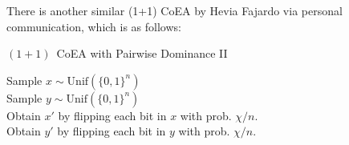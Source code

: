 \documentclass[a4paper,11pt]{report}
\theoremstyle{plain} %
\theoremstyle{definition} %
\theoremstyle{remark} %
\newcommand{\ocoea}{${(1 + 1)}$~CoEA\xspace}
\begin{document}
\begin{comment}
\begin{tcolorbox}
$\textbf{Competitive Coevolutionary (1+1) Algorithm:}$

$\mathbf{Require:}$ 

\quad A finite state space $\mathcal{X}=\{0,1\}$, and initial populations  $P_{0}, Q_{0}\in \mathcal{X}^{\lambda }$, where $\lambda = n \in \mathbb{N}$ is population size and mutation rate $\theta \in (0,n]$ 

\quad \textit{Selection Mechanism} $p_{sel}:\mathcal{X}^{\lambda } \times \mathcal{X}^{l} \rightarrow [0,1]$. 


\quad \textit{Mutation Operator} $p_{mul}:\mathcal{X}^l \times \mathcal{X} \rightarrow [0,1]$.


1: \textbf{Initialization:}  Independently Sample $P_{0} \sim Unif(\mathcal{X}^{\lambda })$; Sample $Q_{0} \sim Unif(\mathcal{X}^{\lambda })$; 

2: \textbf{Mutation:} Create $x',y'$ by independently flipping each bit in $x,y$ respectively according to probability $p_{mut}(y,\cdot)= \min\{\theta/n, 1/2\}$;

4: \textbf{Selection:} Sample $i$-th parent $x$ according to $p_{sel}(P_{t},\cdot)$.



5:\quad \quad \quad  \textbf{If} $h(x,y') \leq h(x,y)$:

6:\quad  \quad \quad \quad    \textbf{then} $y:= y'$; 

7:\quad \quad \quad  \textbf{else}: 

8:\quad  \quad \quad \quad     \textbf{then} $y:= y$;


9:\quad \quad \quad \textbf{If} $h(x',y) \geq h(x,y)$:
    
10:\quad  \quad \quad \quad     \textbf{then} $x:= x'$; 

11:\quad \quad \quad  \textbf{else}: 

12:\quad  \quad \quad \quad     \textbf{then} $x:= x$; 

13:\quad  \quad \quad \textbf{end if}

14:\quad  \quad \quad  \textbf{Set} $P_{0}:=x$;  $Q_{0}:=y$

\end{tcolorbox}

\end{comment}

\newpage
There is another similar (1+1) CoEA by Hevia Fajardo via personal communication, which is as follows:
\begin{algorithm}
\caption{\ocoea with Pairwise Dominance II}
\label{alg:ocoea2}
Sample $x\sim\mathrm{Unif}(\{0,1\}^n)$\\
Sample $y\sim\mathrm{Unif}(\{0,1\}^n)$\\
	{
	Obtain $x'$ by flipping each bit in $x$ with prob. $\chi/n$.\\
	Obtain $y'$ by flipping each bit in $y$ with prob. $\chi/n$.\\
}
\end{algorithm}
\end{document}

